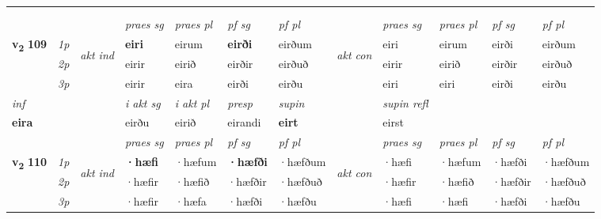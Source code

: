 \begin{longtable}[l]{X>{\footnotesize\itshape}llXXXXlXXXX}
\midrule

  & \\*
  & \\
    \midrule
 & &   & \textit{praes sg}  & \textit{praes pl}    & \textit{ pf sg} & \textit{pf pl} & & \textit{praes sg}  & \textit{praes pl}    & \textit{pf sg} & \textit{pf pl }  \\ \cmidrule{4-7} \cmidrule{9-12}
 \multirow{2}{*}{{{\textbf{v{\textsubscript{2}}} \Large{\textbf{109}}}}}  & 1p & \multirow{3}{*}{\begin{turn}{90}\textit{akt ind}\end{turn}} & \textbf{eiri} & eirum & \textbf{eirði} & eirðum & \multirow{3}{*}{\begin{turn}{90}\textit{akt con}\end{turn}} &eiri & eirum & eirði & eirðum\\*
 & 2p &  &  eirir  & eirið & eirðir & eirðuð & & eirir & eirið & eirðir & eirðuð \\*
 & 3p &  & eirir & eira & eirði & eirðu & & eiri & eiri& eirði & eirðu \\*
\cmidrule{4-7} \cmidrule{9-12}

   {\textit{inf}} & &  & \textit{i akt sg} & \textit{i akt pl}   & \textit{presp} & \textit{supin} && \textit{supin refl}  \\*
  {\textbf{eira}} & && eirðu  & eirið   & eirandi &  \textbf{eirt} && eirst  \\*

\midrule

 & &   & \textit{praes sg}  & \textit{praes pl}    & \textit{ pf sg} & \textit{pf pl} & & \textit{praes sg}  & \textit{praes pl}    & \textit{pf sg} & \textit{pf pl }  \\ \cmidrule{4-7} \cmidrule{9-12}
 \multirow{2}{*}{{{\textbf{v{\textsubscript{2}}} \Large{\textbf{110}}}}}  & 1p & \multirow{3}{*}{\begin{turn}{90}\textit{akt ind}\end{turn}} & \textbf{·hæfi} & ·hæfum & \textbf{·hæfði} & ·hæfðum & \multirow{3}{*}{\begin{turn}{90}\textit{akt con}\end{turn}} &·hæfi & ·hæfum & ·hæfði & ·hæfðum\\*
 & 2p &  &  ·hæfir  & ·hæfið & ·hæfðir & ·hæfðuð & & ·hæfir & ·hæfið & ·hæfðir & ·hæfðuð \\*
 & 3p &  & ·hæfir & ·hæfa & ·hæfði & ·hæfðu & & ·hæfi & ·hæfi& ·hæfði & ·hæfðu \\*
\cmidrule{4-7} \cmidrule{9-12}


\end{longtable}
